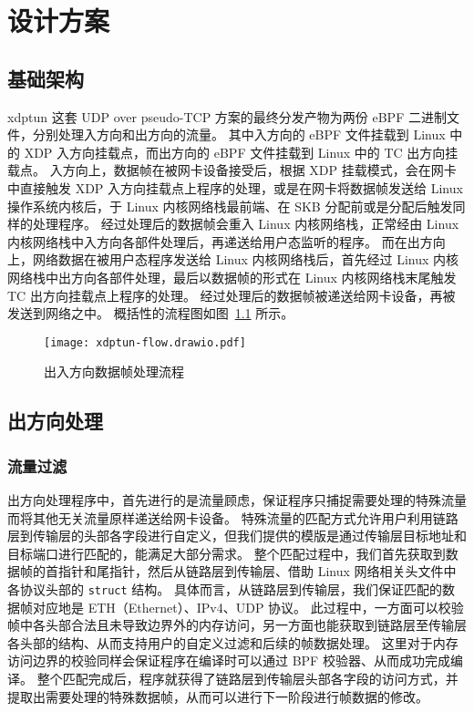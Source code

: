 

\chapter{设计方案}

\section{基础架构}

xdptun 这套 UDP over pseudo-TCP 方案的最终分发产物为两份 eBPF 二进制文件，分别处理入方向和出方向的流量。
其中入方向的 eBPF 文件挂载到 Linux 中的 XDP 入方向挂载点，而出方向的 eBPF 文件挂载到 Linux 中的 TC 出方向挂载点。
入方向上，数据帧在被网卡设备接受后，根据 XDP 挂载模式，会在网卡中直接触发 XDP 入方向挂载点上程序的处理，或是在网卡将数据帧发送给 Linux 操作系统内核后，于 Linux 内核网络栈最前端、在 SKB 分配前或是分配后触发同样的处理程序。
经过处理后的数据帧会重入 Linux 内核网络栈，正常经由 Linux 内核网络栈中入方向各部件处理后，再递送给用户态监听的程序。
而在出方向上，网络数据在被用户态程序发送给 Linux 内核网络栈后，首先经过 Linux 内核网络栈中出方向各部件处理，最后以数据帧的形式在 Linux 内核网络栈末尾触发 TC 出方向挂载点上程序的处理。
经过处理后的数据帧被递送给网卡设备，再被发送到网络之中。
概括性的流程图如图~\ref{fig:flow} 所示。

\begin{figure}[h]
  \centering
  \texttt{[image: xdptun-flow.drawio.pdf]}
  \caption{出入方向数据帧处理流程}
  \label{fig:flow}
\end{figure}

\section{出方向处理}

\subsection{流量过滤}

出方向处理程序中，首先进行的是流量顾虑，保证程序只捕捉需要处理的特殊流量而将其他无关流量原样递送给网卡设备。
特殊流量的匹配方式允许用户利用链路层到传输层的头部各字段进行自定义，但我们提供的模版是通过传输层目标地址和目标端口进行匹配的，能满足大部分需求。
整个匹配过程中，我们首先获取到数据帧的首指针和尾指针，然后从链路层到传输层、借助 Linux 网络相关头文件中各协议头部的 \texttt{struct} 结构。
具体而言，从链路层到传输层，我们保证匹配的数据帧对应地是 ETH（Ethernet）、IPv4、UDP 协议。
此过程中，一方面可以校验帧中各头部合法且未导致边界外的内存访问，另一方面也能获取到链路层至传输层各头部的结构、从而支持用户的自定义过滤和后续的帧数据处理。
这里对于内存访问边界的校验同样会保证程序在编译时可以通过 BPF 校验器、从而成功完成编译。
整个匹配完成后，程序就获得了链路层到传输层头部各字段的访问方式，并提取出需要处理的特殊数据帧，从而可以进行下一阶段进行帧数据的修改。


